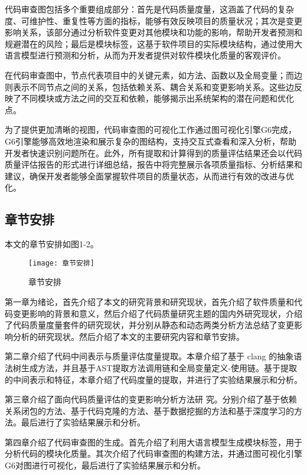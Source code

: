 代码审查图包括多个重要组成部分：首先是代码质量度量，这涵盖了代码的复杂度、可维护性、重复性等方面的指标，能够有效反映项目的质量状况；其次是变更影响关系，该部分通过分析软件变更对其他模块和功能的影响，帮助开发者预测和规避潜在的风险；最后是模块标签，这基于软件项目的实际模块结构，通过使用大语言模型进行预测和分析，从而为开发者提供对软件模块化质量的客观评价。

在代码审查图中，节点代表项目中的关键元素，如方法、函数以及全局变量；而边则表示不同节点之间的关系，包括依赖关系、耦合关系和变更影响关系。这些边反映了不同模块或方法之间的交互和依赖，能够揭示出系统架构的潜在问题和优化点。

为了提供更加清晰的视图，代码审查图的可视化工作通过图可视化引擎G6完成，G6引擎能够高效地渲染和展示复杂的图结构，支持交互式查看和深入分析，帮助开发者快速识别问题所在。此外，所有提取和计算得到的质量评估结果还会以代码质量评估报告的形式进行详细总结，报告中将完整展示各项质量指标、分析结果和建议，确保开发者能够全面掌握软件项目的质量状态，从而进行有效的改进与优化。

\subsection{章节安排}

本文的章节安排如图1-2。

\begin{figure}[h]
\centering
\texttt{[image: 章节安排]}
\caption{章节安排}
\end{figure}

第一章为绪论，首先介绍了本文的研究背景和研究现状，首先介绍了软件质量和代码变更影响的背景和意义，然后介绍了代码质量研究主题的国内外研究现状，介绍了代码质量度量套件的研究现状，并分别从静态和动态两类分析方法总结了变更影响分析的研究现状。然后介绍了本文的主要研究内容和章节安排。

第二章介绍了代码中间表示与质量评估度量提取。本章介绍了基于 clang 的抽象语法树生成方法，并且基于AST提取方法调用链和全局变量定义-使用链。基于提取的中间表示和特征，本章介绍了代码度量的提取，并进行了实验结果展示和分析。

第三章介绍了面向代码质量评估的变更影响分析方法研
究。分别介绍了基于依赖关系闭包的方法、基于代码克隆的方法、基于数据挖掘的方法和基于深度学习的方法。最后进行了实验结果展示和分析。

第四章介绍了代码审查图的生成。首先介绍了利用大语言模型生成模块标签，用于分析代码的模块化质量。其次介绍了代码审查图的构建方法，并通过图可视化引擎G6对图进行可视化，最后进行了实验结果展示和分析。



